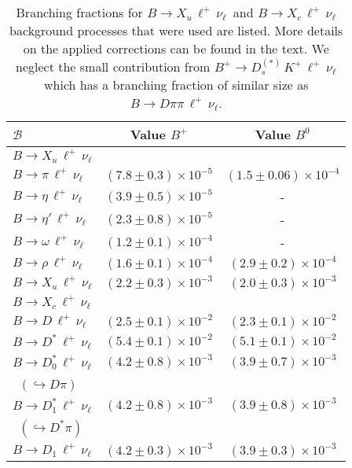 \documentclass[twocolumn,aps,prd,superscriptaddress,nofootinbib,floatfix,preprintnumbers,a4]{revtex4-1}
\newcommand{\bulnu}{\ensuremath{B \to X_u \, \ell^+\, \nu_{\ell}}\xspace}
\newcommand{\bclnu}{\ensuremath{B \to X_c \, \ell^+\, \nu_{\ell}}\xspace}
\newcommand{\bpilnu}{\ensuremath{B \to \pi \, \ell^+\,\nu_{\ell}}\xspace}
\newcommand{\brholnu}{\ensuremath{B \to \rho \, \ell^+\,\nu_{\ell}}\xspace}
\newcommand{\bomegalnu}{\ensuremath{B \to \omega \, \ell^+\,\nu_{\ell}}\xspace}
\newcommand{\betalnu}{\ensuremath{B \to \eta \, \ell^+\,\nu_{\ell}}\xspace}
\newcommand{\betaplnu}{\ensuremath{B \to \eta' \, \ell^+\,\nu_{\ell}}\xspace}
\begin{document}
\begin{table}[t!]
\caption{
	Branching fractions for \bulnu\ and \bclnu background processes that were used are listed. More details on the applied corrections can be found in the text. We neglect the small contribution from $B^+ \to D_s^{(*)} \, K^+ \, \ell^+ \, \nu_\ell$ which has a branching fraction of similar size as $B \to D \pi \pi \, \ell^+ \, \nu_\ell$.
}
\label{tab:bfs}
\vspace{1ex}
\begin{tabular}{lcc}
\hline\hline
 $\mathcal{B}$ & Value $B^+$ & Value $B^0$  \\
 \hline
 \bulnu & \\
 \quad \bpilnu & $\left(7.8 \pm 0.3 \right) \times 10^{-5}$ & $\left(1.5 \pm 0.06 \right) \times 10^{-4}$ \\
 \quad \betalnu & $\left(3.9 \pm 0.5 \right)  \times 10^{-5}$ & - \\
 \quad \betaplnu & $\left(2.3 \pm 0.8 \right) \times 10^{-5}$ & - \\
 \quad  \bomegalnu & $\left(1.2 \pm 0.1 \right)  \times 10^{-4}$ & - \\
 \quad  \brholnu & $\left(1.6 \pm 0.1\right)  \times 10^{-4}$ & $\left(2.9 \pm 0.2\right)  \times 10^{-4}$ \\
 \quad  $B \to X_u \, \ell^+ \, \nu_\ell$ & $\left(2.2 \pm 0.3 \right)  \times 10^{-3}$ & $\left(2.0 \pm 0.3 \right)  \times 10^{-3}$ \\
 \hline 
 \bclnu & \\
 \quad $B \to D \, \ell^+ \, \nu_\ell$ & $\left(2.5 \pm 0.1\right) \times 10^{-2} $ & $\left(2.3 \pm 0.1\right)\times 10^{-2} $ \\
 \quad $B \to D^* \, \ell^+ \, \nu_\ell$ & $\left(5.4 \pm 0.1 \right)\times 10^{-2} $ &$\left( 5.1 \pm 0.1 \right)\times 10^{-2} $ \\
  \quad $B \to D_0^* \, \ell^+ \, \nu_\ell$  & $\left(4.2 \pm 0.8\right) \times 10^{-3}$ & $\left(3.9 \pm 0.7\right) \times 10^{-3}$ \\
  \quad\, $(\hookrightarrow D \pi)$ \\ 
  \quad $B \to D_1^* \, \ell^+ \, \nu_\ell$ & $\left(4.2 \pm 0.8\right) \times 10^{-3}$ & $\left(3.9 \pm 0.8\right) \times 10^{-3}$   \\
    \quad\, $(\hookrightarrow D^* \pi)$ \\
  \quad $B \to D_1 \, \ell^+ \, \nu_\ell$ &  $\left(4.2 \pm 0.3\right) \times 10^{-3}$ & $\left(3.9 \pm 0.3\right) \times 10^{-3}$  \\

\end{tabular}
\end{table}
\end{document}
